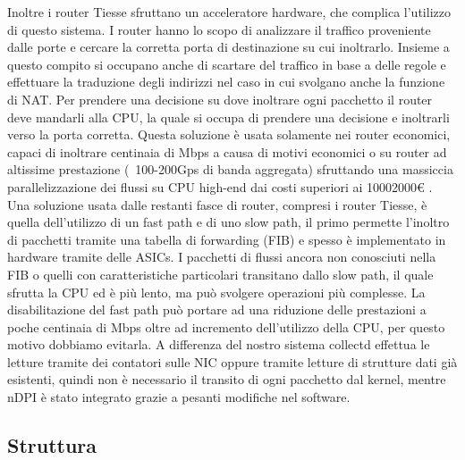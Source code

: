 Inoltre i router Tiesse sfruttano un acceleratore hardware, che complica l'utilizzo di questo sistema. I router hanno lo scopo di analizzare il traffico proveniente dalle porte e cercare la corretta porta di destinazione su cui inoltrarlo. Insieme a questo compito si occupano anche di scartare del traffico in base a delle regole e effettuare la traduzione degli indirizzi nel caso in cui svolgano anche la funzione di NAT. Per prendere una decisione su dove inoltrare ogni pacchetto il router deve mandarli alla CPU, la quale si occupa di prendere una decisione e inoltrarli verso la porta corretta. Questa soluzione è usata solamente nei router economici, capaci di inoltrare centinaia di Mbps a causa di motivi economici o su router ad altissime prestazione (~100-200Gps di banda aggregata) sfruttando una massiccia parallelizzazione dei flussi su CPU high-end dai costi superiori ai 1000\/2000€ \cite{risso_sn}. Una soluzione usata dalle restanti fasce di router, compresi i router Tiesse, è quella dell'utilizzo di un fast path e di uno slow path, il primo permette l'inoltro di pacchetti tramite una tabella di forwarding (FIB) e spesso è implementato in hardware tramite delle ASICs. I pacchetti di flussi ancora non conosciuti nella FIB o quelli con caratteristiche particolari transitano dallo slow path, il quale sfrutta la CPU ed è più lento, ma può svolgere operazioni più complesse. La disabilitazione del fast path può portare ad una riduzione delle prestazioni a poche centinaia di Mbps oltre ad incremento dell'utilizzo della CPU, per questo motivo dobbiamo evitarla. 
A differenza del nostro sistema collectd effettua le letture tramite dei contatori sulle NIC oppure tramite letture di strutture dati già esistenti, quindi non è necessario il transito di ogni pacchetto dal kernel, mentre nDPI è stato integrato grazie a pesanti modifiche nel software.





\subsection{Struttura}

